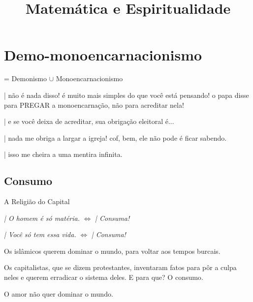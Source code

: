 \documentclass[12pt,a4paper]{article}
\title{Matem\'atica e Espiritualidade}
\date{}
\begin{document}
	\maketitle

	\tableofcontents
	\addtocontents{}{\protect\rule{\textwidth}{.2pt}\par}

	\section{Demo-monoencarnacionismo}
			\begin{flushright}
			\end{flushright}

		= Demonismo $ \cup $ Monoencarnacionismo


| n\~ao \'e nada disso! \'e muito mais simples do que voc\^e est\'a pensando! o
papa disse para PREGAR a monoencarna\c{c}\~ao, n\~ao para acreditar nela!

| e se voc\^e deixa de acreditar, sua obriga\c{c}\~ao eleitoral \'e...

| nada me obriga a largar a igreja! cof, bem, ele n\~ao pode \'e ficar
sabendo.

| isso me cheira a uma mentira infinita.

		\subsection{Consumo}
			\begin{flushright}
			\end{flushright}

			A Religi\~ao do Capital

			\emph{| O homem \'e s\'o mat\'eria.} $ \Leftrightarrow $ \emph{| Consuma!}

			\emph{| Voc\^e s\'o tem essa vida.}\cite{mono} $ \Leftrightarrow $ \emph{| Consuma!}

			Os isl\^amicos querem dominar o mundo, para voltar aos tempos burcais.

			Os capitalistas, que se dizem protestantes, inventaram fatos para p\^or a culpa neles e querem erradicar o sistema deles. E para que? O consumo\cite{x}.

			O amor\cite{x} n\~ao quer dominar o mundo.

			\begin{flushright}
			\end{flushright}
\end{document}
